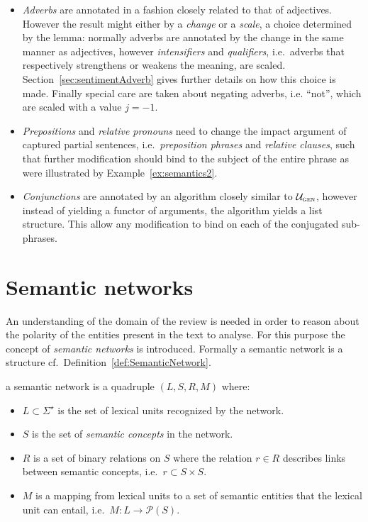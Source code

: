 \begin{itemize}
	\item \emph{Adverbs} are annotated in a fashion closely related to that of adjectives. However the result might either by a \emph{change} or a \emph{scale}, a choice determined by the lemma: normally adverbs are annotated by the change in the same manner as adjectives, however \emph{intensifiers} and \emph{qualifiers}, i.e.\ adverbs that respectively strengthens or weakens the meaning, are scaled. Section~\ref{sec:sentimentAdverb} gives further details on how this choice is made. Finally special care are taken about negating adverbs, i.e. ``not'', which are scaled with a value $j = -1$.

	\item \emph{Prepositions} and \emph{relative pronouns} need to change the impact argument of captured partial sentences, i.e.\ \emph{preposition phrases} and \emph{relative clauses}, such that further modification should bind to the subject of the entire phrase as were illustrated by Example~\ref{ex:semantics2}.

	\item \emph{Conjunctions} are annotated by an algorithm closely similar to $\mathcal{U}_\textsc{gen}$, however instead of yielding a functor of arguments, the algorithm yields a list structure. This allow any modification to bind on each of the conjugated sub-phrases.
	
\end{itemize}


\section{Semantic networks}
\label{sec:sentimentValue}

An understanding of the domain of the review is needed in order to reason about the polarity of the entities present in the text to analyse.  For this purpose the concept of \emph{semantic networks} is introduced. Formally a semantic network is a structure cf.\ Definition~\ref{def:SemanticNetwork}.
\begin{definition}
a semantic network is a quadruple $(L,S,R,M)$ where:\\[-2em]
  \begin{itemize} %
    \item $L \subset \Sigma^\star$ is the set of lexical units recognized by the network.
    \item $S$ is the set of \emph{semantic concepts} in the network.
    \item $R$ is a set of binary relations on $S$ where the relation $r \in R$ describes links\\ between semantic concepts, i.e.\ $r \subset S \times S$. 
    \item $M$ is a mapping from lexical units to a set of semantic entities that the lexical\\ unit can entail, i.e.\ $M: L \to \mathcal{P}(S)$.
  \end{itemize}
  \label{def:SemanticNetwork}
  \vspace{-1em}
  \done
\end{definition}
\vspace{-2em}

